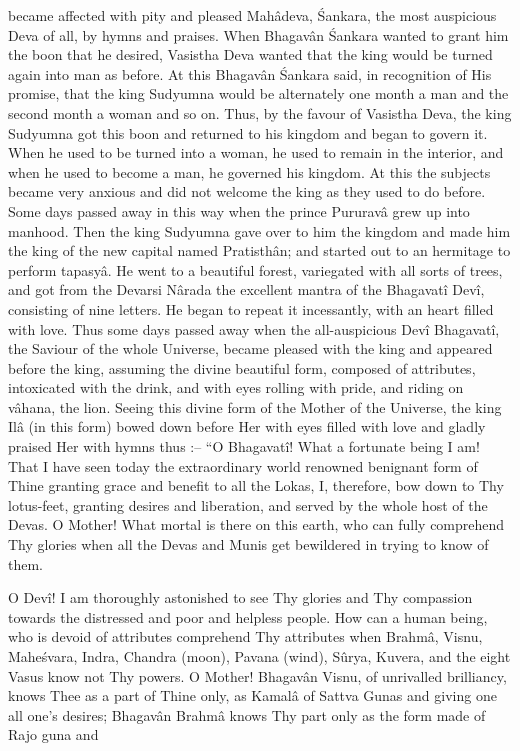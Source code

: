 became affected with pity and pleased Mah\^adeva, \'Sankara, the most auspicious Deva of all, by hymns and praises. When Bhagav\^an \'Sankara wanted to grant him the boon that he desired, Vasistha Deva wanted that the king would be turned again into man as before. At this Bhagav\^an \'Sankara said, in recognition of His promise, that the king Sudyumna would be alternately one month a man and the second month a woman and so on. Thus, by the favour of Vasistha Deva, the king Sudyumna got this boon and returned to his kingdom and began to govern it. When he used to be turned into a woman, he used to remain in the interior, and when he used to become a man, he governed his kingdom. At this the subjects became very anxious and did not welcome the king as they used to do before. Some days passed away in this way when the prince Pururav\^a grew up into manhood. Then the king Sudyumna gave over to him the kingdom and made him the king of the new capital named Pratisth\^an; and started out to an hermitage to perform tapasy\^a. He went to a beautiful forest, variegated with all sorts of trees, and got from the Devarsi N\^arada the excellent mantra of the Bhagavat\^i Dev\^i, consisting of nine letters. He began to repeat it incessantly, with an heart filled with love. Thus some days passed away when the all-auspicious Dev\^i Bhagavat\^i, the Saviour of the whole Universe, became pleased with the king and appeared before the king, assuming the divine beautiful form, composed of attributes, intoxicated with the drink, and with eyes rolling with pride, and riding on v\^ahana, the lion. Seeing this divine form of the Mother of the Universe, the king Il\^a (in this form) bowed down before Her with eyes filled with love and gladly praised Her with hymns thus :-- ``O Bhagavat\^i! What a fortunate being I am! That I have seen today the extraordinary world renowned benignant form of Thine granting grace and benefit to all the Lokas, I, therefore, bow down to Thy lotus-feet, granting desires and liberation, and served by the whole host of the Devas. O Mother! What mortal is there on this earth, who can fully comprehend Thy glories when all the Devas and Munis get bewildered in trying to know of them.

O Dev\^i! I am thoroughly astonished to see Thy glories and Thy compassion towards the distressed and poor and helpless people. How can a human being, who is devoid of attributes comprehend Thy attributes when Brahm\^a, Visnu, Mahe\'svara, Indra, Chandra (moon), Pavana (wind), S\^urya, Kuvera, and the eight Vasus know not Thy powers. O Mother! Bhagav\^an Visnu, of unrivalled brilliancy, knows Thee as a part of Thine only, as Kamal\^a of Sattva Gunas and giving one all one's desires; Bhagav\^an Brahm\^a knows Thy part only as the form made of Rajo guna and

